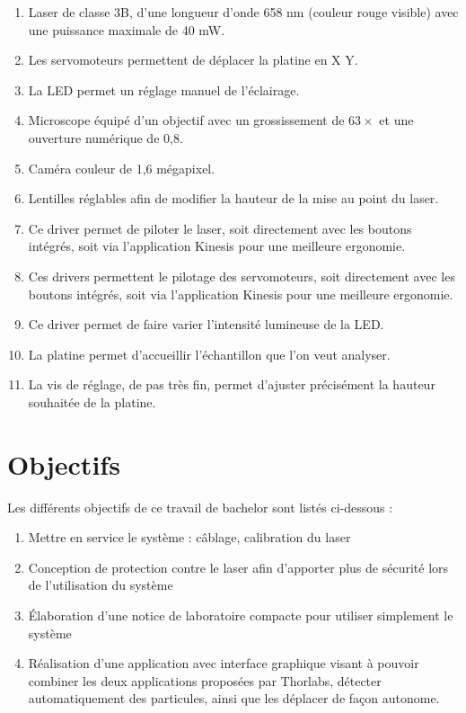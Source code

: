 \begin{enumerate}
    \item Laser de classe 3B, d'une longueur d'onde 658 nm (couleur rouge visible) avec une puissance maximale de 40 mW.
    \item Les servomoteurs permettent de déplacer la platine en X Y.
    \item La LED permet un réglage manuel de l'éclairage.
    \item Microscope équipé d'un objectif avec un grossissement de $63\times$ et une ouverture numérique de 0,8.
    \item Caméra couleur de 1,6 mégapixel.
    \item Lentilles réglables afin de modifier la hauteur de la mise au point du laser.
    \item Ce driver permet de piloter le laser, soit directement avec les boutons intégrés, soit via l'application Kinesis \cite{kinesisSoftware} pour une meilleure ergonomie.
    \item Ces drivers permettent le pilotage des servomoteurs, soit directement avec les boutons intégrés, soit via l'application Kinesis pour une meilleure ergonomie.
    \item Ce driver permet de faire varier l'intensité lumineuse de la LED.
    \item La platine permet d'accueillir l'échantillon que l'on veut analyser.
    \item La vis de réglage, de pas très fin, permet d'ajuster précisément la hauteur souhaitée de la platine.
\end{enumerate}

\section{Objectifs}

Les différents objectifs de ce travail de bachelor sont listés ci-dessous :
\begin{enumerate}
    \item Mettre en service le système : câblage, calibration du laser
    \item Conception de protection contre le laser afin d'apporter plus de sécurité lors de l'utilisation du système
    \item Élaboration d'une notice de laboratoire compacte pour utiliser simplement le système
    \item Réalisation d'une application avec interface graphique visant à pouvoir combiner les deux applications proposées par Thorlabs, détecter automatiquement des particules, ainsi que les déplacer de façon autonome.
\end{enumerate}


